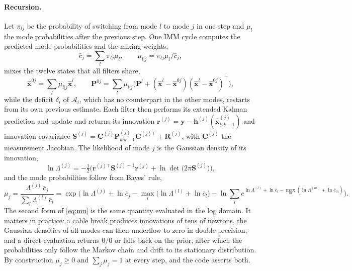 \documentclass[10pt]{article}
\newcommand{\vc}[1]{\bm{#1}}
\newcommand{\mt}[1]{\mathbf{#1}}
\begin{document}
\paragraph{Recursion.} Let $\pi_{lj}$ be the probability of switching from mode $l$ to mode $j$ in one step and $\mu_l$ the mode probabilities after the previous step. One IMM cycle \citep{blom1988imm} computes the predicted mode probabilities and the mixing weights,
\begin{equation}
\bar c_j=\sum_l\pi_{lj}\mu_l,\qquad \mu_{l|j}=\pi_{lj}\mu_l/\bar c_j ,
\end{equation}
mixes the twelve states that all filters share,
\begin{equation}
\hat{\vc x}^{0j}=\sum_l\mu_{l|j}\hat{\vc x}^{l},\qquad
\mt P^{0j}=\sum_l\mu_{l|j}\Big(\mt P^{l}+(\hat{\vc x}^{l}-\hat{\vc x}^{0j})(\hat{\vc x}^{l}-\hat{\vc x}^{0j})^\top\Big),
\end{equation}
while the deficit $\delta_i$ of $\mathcal A_i$, which has no counterpart in the other modes, restarts from its own previous estimate. Each filter then performs its extended Kalman prediction and update and returns its innovation $\vc r^{(j)}=\vc y-\vc h^{(j)}(\hat{\vc x}^{(j)}_{k|k-1})$ and innovation covariance $\mt S^{(j)}=\mt C^{(j)}\mt P^{(j)}_{k|k-1}\mt C^{(j)\top}+\mt R^{(j)}$, with $\mt C^{(j)}$ the measurement Jacobian. The likelihood of mode $j$ is the Gaussian density of its innovation,
\begin{equation}\label{eq:lik}
\ln\Lambda^{(j)}=-\tfrac12\Big(\vc r^{(j)\top}\mt S^{(j)-1}\vc r^{(j)}+\ln\det\big(2\pi\mt S^{(j)}\big)\Big),
\end{equation}
and the mode probabilities follow from Bayes' rule,
\begin{equation}\label{eq:mu}
\mu_j=\frac{\Lambda^{(j)}\,\bar c_j}{\sum_l\Lambda^{(l)}\,\bar c_l}
=\exp\!\Big(\ln\Lambda^{(j)}+\ln\bar c_j-\max_l\big(\ln\Lambda^{(l)}+\ln\bar c_l\big)-\ln\!\sum_l e^{\ln\Lambda^{(l)}+\ln\bar c_l-\max_m(\ln\Lambda^{(m)}+\ln\bar c_m)}\Big).
\end{equation}
The second form of \eqref{eq:mu} is the same quantity evaluated in the log domain. It matters in practice: a cable break produces innovations of tens of newtons, the Gaussian densities of all modes can then underflow to zero in double precision, and a direct evaluation returns $0/0$ or falls back on the prior, after which the probabilities only follow the Markov chain and drift to its stationary distribution. By construction $\mu_j\ge0$ and $\sum_j\mu_j=1$ at every step, and the code asserts both.
\end{document}
